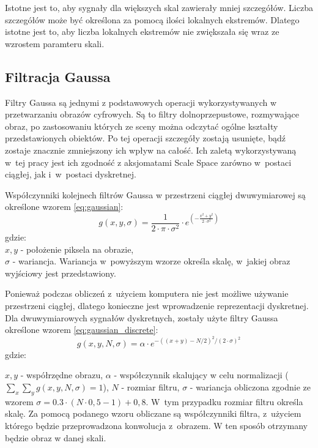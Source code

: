 Istotne jest to, aby sygnały dla większych skal zawierały mniej szczegółów. Liczba szczegółów może być określona za pomocą ilości lokalnych ekstremów. Dlatego istotne jest to, aby liczba lokalnych ekstremów nie zwiększała się wraz ze wzrostem paramteru skali.

\subsection{Filtracja Gaussa}
\label{subsec:filtracjaGaussa}
Filtry Gaussa są jednymi z podstawowych operacji wykorzystywanych w przetwarzaniu obrazów cyfrowych. Są to filtry dolnoprzepustowe, rozmywające obraz, po zastosowaniu których ze sceny można odczytać ogólne kształty przedstawionych obiektów. Po tej operacji szczegóły zostają usunięte, bądź zostaje znacznie zmniejszony ich wpływ na całość. Ich zaletą wykorzystywaną w~tej pracy jest ich zgodność z aksjomatami Scale Space zarówno w~postaci ciągłej, jak i~w~postaci dyskretnej.

Współczynniki kolejnech filtrów Gaussa w przestrzeni ciągłej dwuwymiarowej są określone wzorem \ref{eq:gaussian}:
\begin{equation}
\label{eq:gaussian}
g(x,y,\sigma)=\frac{1}{2 \cdot \pi \cdot \sigma^ {2} }\cdot e^{(-\frac{x^{2} + y^{2}}{2 \cdot \sigma ^{2}})}
\end{equation}
gdzie:\\

$ x,y $ - położenie piksela na obrazie, \\
$ \sigma $ - wariancja.
\newline
Wariancja w~powyższym wzorze określa skalę, w~jakiej obraz wyjściowy jest przedstawiony. 

Ponieważ podczas obliczeń z~użyciem komputera nie jest możliwe używanie przestrzeni ciągłej, dlatego konieczne jest wprowadzenie reprezentacji dyskretnej. 
Dla dwuwymiarowych sygnałów dyskretnych, zostały użyte filtry Gaussa określone wzorem \ref{eq:gaussian_discrete}:
\begin{equation}
\label{eq:gaussian_discrete}
g(x,y,N,\sigma) = \alpha \cdot e^{-((x+y)-N/2)^2/(2 \cdot \sigma)^2}
\end{equation}
gdzie: \newline 

$ x, y$ - współrzędne obrazu, \newline
$ \alpha $ - współczynnik skalujący w celu normalizacji ($ \sum_x \sum_y g(x,y,N,\sigma) = 1 $), \newline
$ N $ - rozmiar filtru, \newline
$ \sigma $ - wariancja obliczona zgodnie ze wzorem $ \sigma = 0.3 \cdot (N \cdot 0,5 - 1) + 0,8$. \newline
W~tym przypadku rozmiar filtru określa skalę. Za pomocą podanego wzoru obliczane są współczynniki filtra, z~użyciem którego będzie przeprowadzona konwolucja z~obrazem. W ten sposób otrzymany będzie obraz w danej skali.

